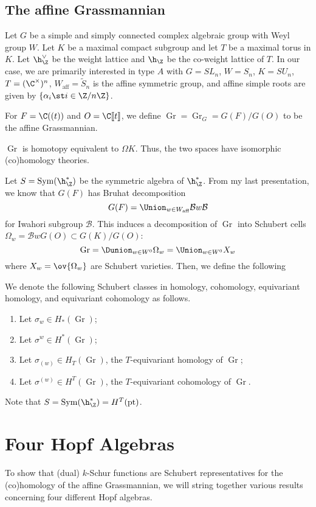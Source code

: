 \documentclass[11pt,leqno,oneside]{amsart}
\numberwithin{thm}{section}
\renewcommand{\W}{W}
\newcommand{\Waff}{\W_{\text{aff}}}
\newcommand{\eS}{\tilde{S}}
\newcommand{\Gr}{\operatorname{Gr}}
\newcommand{\Bc}{\mathcal{B}}
\begin{document}
\subsection{The affine Grassmannian}
Let \(G\) be a simple and simply connected complex algebraic group
with Weyl group \(\W\). Let \(K\) be a maximal compact subgroup and
let \(T\) be a maximal torus in \(K\). Let \(\h_\Z^\vee\) be the
weight lattice and \(\h_\Z\) be the co-weight lattice of \(T\). In our
case, we are primarily interested in type \(A\) with \(G = SL_n\), \(\W = S_n\), \(K =
SU_n\), \(T = (\C^\times)^n\), \(\Waff = \eS_n\) is the affine symmetric group, and
affine simple roots are given by \(\{\alpha_i \st i \in \Z/n\Z\}\).

For \(F = \C((t))\) and \(O = \C \llbracket t \rrbracket\), we define
\(\Gr = \Gr_G = G(F)/G(O)\) to be the affine Grassmannian.
\begin{prop}
 \(\Gr\) is homotopy equivalent to \(\Omega K\). Thus, the two spaces
 have isomorphic (co)homology theories.
\end{prop}
Let \(S = \operatorname{Sym}(\h_\Z^*)\) be the
symmetric algebra of \(\h^*_\Z\). From my last presentation, we know
that \(G(F)\) has Bruhat decomposition \[
  G(F) = \Union_{w \in \Waff} \Bc w \Bc
\]
for Iwahori subgroup \(\Bc\). This induces a decomposition of \(\Gr\)
into Schubert cells \(\Omega_w = \Bc w G(O) \subset G(K)/G(O)\): \[
  \Gr = \Dunion_{w \in \W^0} \Omega_w = \Union_{w \in W^0} X_w
\]
where \(X_w = \ov{\Omega_w}\) are
Schubert varieties. Then, we define the following
\begin{defn}
  We denote the following Schubert classes in homology, cohomology,
  equivariant homology, and equivariant cohomology as follows.
  \begin{enumerate}
  \item Let \(\sigma_w \in H_*(\Gr)\);
  \item Let \(\sigma^w \in H^*(\Gr)\);
  \item Let \(\sigma_{(w)} \in H_T(\Gr)\), the \(T\)-equivariant
    homology of \(\Gr\);
  \item Let \(\sigma^{(w)} \in H^T(\Gr)\), the \(T\)-equivariant
    cohomology of \(\Gr\).
  \end{enumerate}
\end{defn}
\begin{rmk}
  Note that \(S = \operatorname{Sym}(\h_\Z^*) = H^T(\text{pt})\).
\end{rmk}
\section{Four Hopf Algebras}
To show that (dual) \(k\)-Schur functions are Schubert representatives for
the (co)homology of the affine Grassmannian, we will string together
various results concerning four different Hopf algebras.
\end{document}
